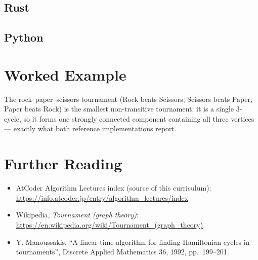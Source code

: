\documentclass[11pt]{article}
\begin{document}
\codenote
\subsection{Rust}

\subsection{Python}

\section{Worked Example}
\begin{examplebox}
The rock–paper–scissors tournament (Rock beats Scissors, Scissors beats
Paper, Paper beats Rock) is the smallest non-transitive tournament: it is
a single $3$-cycle, so it forms one strongly connected component
containing all three vertices --- exactly what both reference
implementations report.
\end{examplebox}

\section{Further Reading}
\begin{itemize}[leftmargin=1.5em]
  \item AtCoder Algorithm Lectures index (source of this curriculum):
        \url{https://info.atcoder.jp/entry/algorithm_lectures/index}
  \item Wikipedia, \emph{Tournament (graph theory)}:
        \url{https://en.wikipedia.org/wiki/Tournament_(graph_theory)}
  \item Y. Manoussakis, ``A linear-time algorithm for finding Hamiltonian
        cycles in tournaments'', Discrete Applied Mathematics 36, 1992,
        pp.\ 199--201.
\end{itemize}
\end{document}
